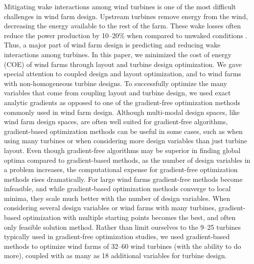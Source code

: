 Mitigating wake interactions among wind turbines is one of the most difficult challenges in wind farm design. Upstream turbines remove energy from the wind, decreasing the energy available to the rest of the farm. These wake losses often reduce the power production by 10--20\% when compared to unwaked conditions \citep{barthelmie2007modelling,barthelmie2009modelling,briggs2013navigating}. 
Thus, a major part of wind farm design is predicting and reducing wake interactions among turbines. 
In this paper, we minimized the cost of energy (COE) of wind farms through layout and turbine design optimization. We gave special attention to coupled design and layout optimization, and to wind farms with non-homogeneous turbine designs.
To successfully optimize the many variables that come from coupling layout and turbine design, we used exact analytic gradients as opposed to one of the gradient-free optimization methods commonly used in wind farm design.
Although multi-modal design spaces, like wind farm design spaces, are often well suited for gradient-free algorithms, gradient-based optimization methods can be useful in some cases, such as when using many turbines or when considering more design variables than just turbine layout. Even though gradient-free algorithms may be superior in finding global optima compared to gradient-based methods, as the number of design variables in a problem increases, the computational expense for gradient-free optimization methods rises dramatically. 
For large wind farms gradient-free methods become infeasible, and while gradient-based optimization methods converge to local minima, they scale much better with the number of design variables.
When considering several design variables or wind farms with many turbines,
gradient-based optimization with multiple starting points becomes the best, and often only feasible solution method. Rather than limit ourselves to the 9--25 turbines typically used in gradient-free optimization studies, we used gradient-based methods to optimize wind farms of 32--60 wind turbines (with the ability to do more), coupled with as many as 18 additional variables for turbine design.


